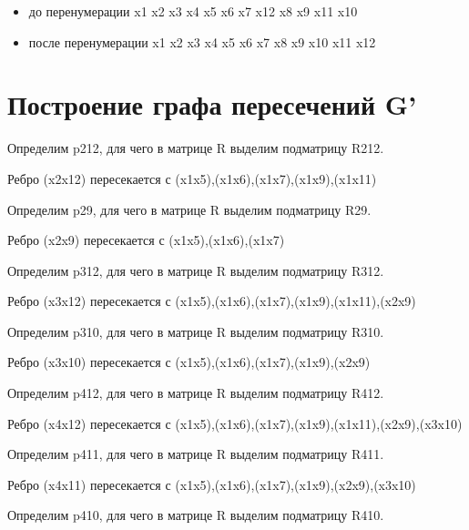 \documentclass{article}
\begin{document}
\begin{itemize}
  \item до перенумерации	  x1	x2	x3	x4	x5	x6	x7	x12	x8	x9	x11	x10
  \item после перенумерации	x1	x2	x3	x4	x5	x6	x7	x8	x9	x10	x11	x12
\end{itemize}



\section{Построение графа пересечений G'}



Определим p212, для чего в матрице R выделим подматрицу R212.



Ребро (x2x12) пересекается с (x1x5),(x1x6),(x1x7),(x1x9),(x1x11)



Определим p29, для чего в матрице R выделим подматрицу R29.



Ребро (x2x9) пересекается с (x1x5),(x1x6),(x1x7)



Определим p312, для чего в матрице R выделим подматрицу R312.



Ребро (x3x12) пересекается с (x1x5),(x1x6),(x1x7),(x1x9),(x1x11),(x2x9)



Определим p310, для чего в матрице R выделим подматрицу R310.



Ребро (x3x10) пересекается с (x1x5),(x1x6),(x1x7),(x1x9),(x2x9)



Определим p412, для чего в матрице R выделим подматрицу R412.



Ребро (x4x12) пересекается с (x1x5),(x1x6),(x1x7),(x1x9),(x1x11),(x2x9),(x3x10)



Определим p411, для чего в матрице R выделим подматрицу R411.



Ребро (x4x11) пересекается с (x1x5),(x1x6),(x1x7),(x1x9),(x2x9),(x3x10)



Определим p410, для чего в матрице R выделим подматрицу R410.
\end{document}
